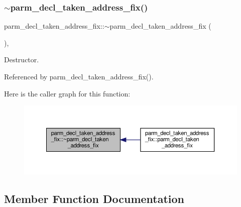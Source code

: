 \subsubsection{\texorpdfstring{$\sim$parm\+\_\+decl\+\_\+taken\+\_\+address\+\_\+fix()}{~parm\_decl\_taken\_address\_fix()}}
{\footnotesize\ttfamily parm\+\_\+decl\+\_\+taken\+\_\+address\+\_\+fix\+::$\sim$parm\+\_\+decl\+\_\+taken\+\_\+address\+\_\+fix (\begin{DoxyParamCaption}{ }\end{DoxyParamCaption})\hspace{0.3cm}{\ttfamily [override]}, {\ttfamily [default]}}



Destructor. 



Referenced by parm\+\_\+decl\+\_\+taken\+\_\+address\+\_\+fix().

Here is the caller graph for this function\+:
\nopagebreak
\begin{figure}[H]
\begin{center}
\leavevmode
\includegraphics[width=350pt]{dc/dfd/classparm__decl__taken__address__fix_a3a432417ede404ca05b53522759ca99a_icgraph}
\end{center}
\end{figure}


\subsection{Member Function Documentation}
\mbox{\label{classparm__decl__taken__address__fix_affc75bf0b1646b76619ad58804f64bd0}} 
